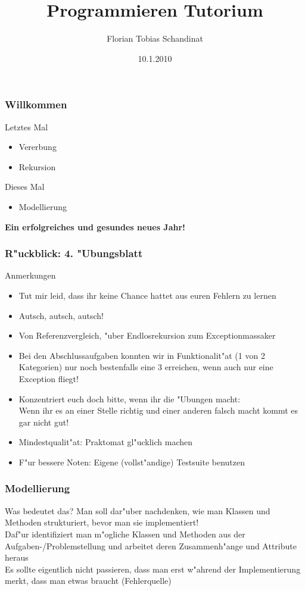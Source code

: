 \documentclass{beamer}
\title{Programmieren Tutorium}
\author{Florian Tobias Schandinat}
\date{10.1.2010}
\institute{FTS}
\begin{document}
\begin{frame}
\frametitle{Willkommen}
\pause
\begin{alertblock}{Letztes Mal}
\begin{itemize}
\item Vererbung
\item Rekursion
\end{itemize}
\end{alertblock}

\begin{block}{Dieses Mal}
\begin{itemize}
\item Modellierung
\end{itemize}
\end{block}
\end{frame}


\begin{frame}
\begin{center}
\textbf{\Huge Ein erfolgreiches und gesundes neues Jahr!}
\end{center}
\end{frame}


\begin{frame}
\frametitle{R"uckblick: 4. "Ubungsblatt}
\begin{block}{Anmerkungen}\pause
\begin{itemize}
\item Tut mir leid, dass ihr keine Chance hattet aus euren Fehlern zu lernen\pause
\item \alert{Autsch, autsch, autsch!}\pause
\item Von Referenzvergleich, "uber Endlosrekursion zum Exceptionmassaker\pause
\item Bei den Abschlussaufgaben konnten wir in Funktionalit"at (1 von 2 Kategorien) nur noch bestenfalls eine 3 erreichen, wenn auch nur eine Exception fliegt!\pause
\item Konzentriert euch doch bitte, wenn ihr die "Ubungen macht:\\Wenn ihr es an einer Stelle richtig und einer anderen falsch macht kommt es gar nicht gut!\pause
\item Mindestqualit"at: Praktomat gl"ucklich machen
\item F"ur bessere Noten: Eigene (vollst"andige) Testsuite benutzen
\end{itemize}
\end{block}
\end{frame}


\begin{frame}
\frametitle{Modellierung}
\begin{block}{Was bedeutet das?}
Man soll dar"uber nachdenken, wie man Klassen und Methoden strukturiert, bevor man sie implementiert!\\\pause
Daf"ur identifiziert man m"ogliche Klassen und Methoden aus der Aufgaben-/Problemstellung und arbeitet deren Zusammenh"ange und Attribute heraus\\\pause
Es sollte eigentlich nicht passieren, dass man erst w"ahrend der Implementierung merkt, dass man etwas braucht (\alert{Fehlerquelle})
\end{block}
\end{frame}
\end{document}
